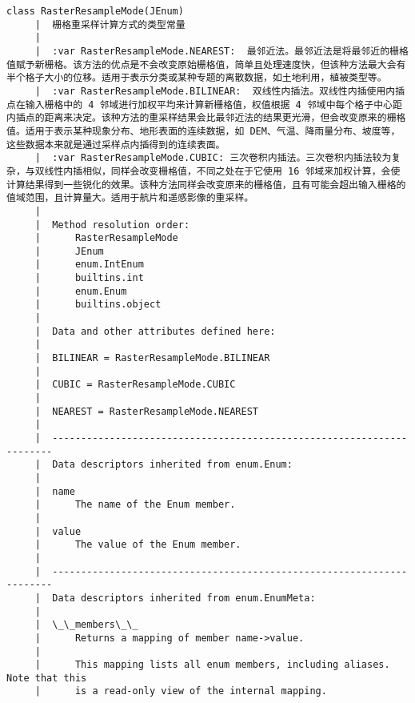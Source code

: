 \documentclass[11pt]{article}
\begin{document}
\begin{Verbatim}[commandchars=\\\{\}]
    class RasterResampleMode(JEnum)
     |  栅格重采样计算方式的类型常量
     |  
     |  :var RasterResampleMode.NEAREST:  最邻近法。最邻近法是将最邻近的栅格值赋予新栅格。该方法的优点是不会改变原始栅格值，简单且处理速度快，但该种方法最大会有半个格子大小的位移。适用于表示分类或某种专题的离散数据，如土地利用，植被类型等。
     |  :var RasterResampleMode.BILINEAR:  双线性内插法。双线性内插使用内插点在输入栅格中的 4 邻域进行加权平均来计算新栅格值，权值根据 4 邻域中每个格子中心距内插点的距离来决定。该种方法的重采样结果会比最邻近法的结果更光滑，但会改变原来的栅格值。适用于表示某种现象分布、地形表面的连续数据，如 DEM、气温、降雨量分布、坡度等，这些数据本来就是通过采样点内插得到的连续表面。
     |  :var RasterResampleMode.CUBIC: 三次卷积内插法。三次卷积内插法较为复杂，与双线性内插相似，同样会改变栅格值，不同之处在于它使用 16 邻域来加权计算，会使计算结果得到一些锐化的效果。该种方法同样会改变原来的栅格值，且有可能会超出输入栅格的值域范围，且计算量大。适用于航片和遥感影像的重采样。
     |  
     |  Method resolution order:
     |      RasterResampleMode
     |      JEnum
     |      enum.IntEnum
     |      builtins.int
     |      enum.Enum
     |      builtins.object
     |  
     |  Data and other attributes defined here:
     |  
     |  BILINEAR = RasterResampleMode.BILINEAR
     |  
     |  CUBIC = RasterResampleMode.CUBIC
     |  
     |  NEAREST = RasterResampleMode.NEAREST
     |  
     |  ----------------------------------------------------------------------
     |  Data descriptors inherited from enum.Enum:
     |  
     |  name
     |      The name of the Enum member.
     |  
     |  value
     |      The value of the Enum member.
     |  
     |  ----------------------------------------------------------------------
     |  Data descriptors inherited from enum.EnumMeta:
     |  
     |  \_\_members\_\_
     |      Returns a mapping of member name->value.
     |      
     |      This mapping lists all enum members, including aliases. Note that this
     |      is a read-only view of the internal mapping.
    

\end{Verbatim}
\end{document}
